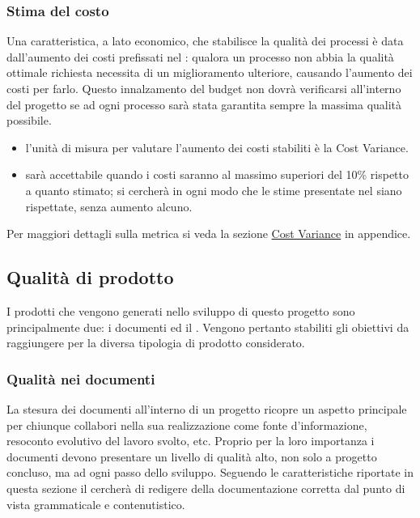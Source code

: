\documentclass[a4paper, titlepage]{article}
\begin{document}
\subsubsection{Stima del costo}
Una caratteristica, a lato economico, che stabilisce la qualità dei processi è data dall'aumento dei costi prefissati nel : qualora un processo non abbia la qualità ottimale richiesta necessita di un miglioramento ulteriore, causando l'aumento dei costi per farlo.
\newline Questo innalzamento del budget non dovrà verificarsi all'interno del progetto se ad ogni processo sarà stata garantita sempre la massima qualità possibile.
\begin{itemize}
\item {} l'unità di misura per valutare l'aumento dei costi stabiliti è la Cost Variance.
\item {} sarà accettabile quando i costi saranno al massimo superiori del 10\% rispetto a quanto stimato; si cercherà in ogni modo che le stime presentate nel  siano rispettate, senza aumento alcuno.
\end{itemize}
Per maggiori dettagli sulla metrica si veda la sezione \hyperref[par:CV]{Cost Variance} in appendice.

\subsection{Qualità di prodotto}
\label{sec:qualprod}
I prodotti che vengono generati nello sviluppo di questo progetto sono principalmente due: i documenti ed il . Vengono pertanto stabiliti gli obiettivi da raggiungere per la diversa tipologia di prodotto considerato.

\subsubsection{Qualità nei documenti}
La stesura dei documenti all'interno di un progetto ricopre un aspetto principale per chiunque collabori nella sua realizzazione come fonte d'informazione, resoconto evolutivo del lavoro svolto, etc. Proprio per la loro importanza i documenti devono presentare un livello di qualità alto, non solo a progetto concluso, ma ad ogni passo dello sviluppo.
\newline Seguendo le caratteristiche riportate in questa sezione il  cercherà di redigere della documentazione corretta dal punto di vista grammaticale e contenutistico.
\end{document}
